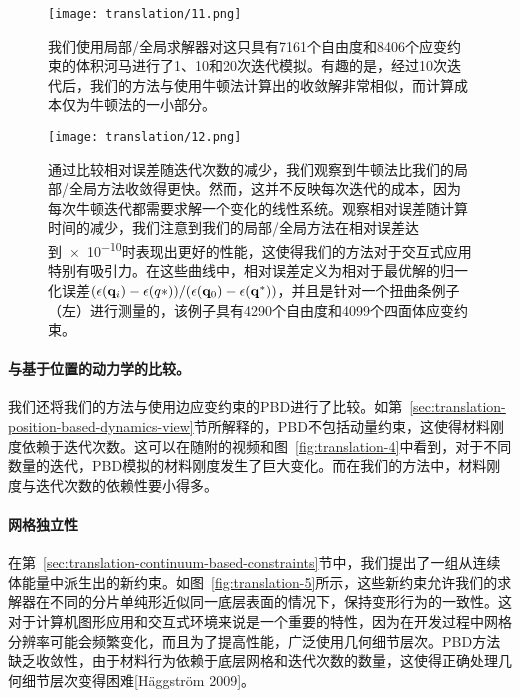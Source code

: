 \begin{translation}
\begin{figure}
  \centering
  \texttt{[image: translation/11.png]}
  \caption{
    我们使用局部/全局求解器对这只具有\num{7161}个自由度和\num{8406}个应变约束的体积河马进行了1、10和20次迭代模拟。有趣的是，经过10次迭代后，我们的方法与使用牛顿法计算出的收敛解非常相似，而计算成本仅为牛顿法的一小部分。
  }
  \label{fig:translation-11}
\end{figure}

\begin{figure}
  \centering
  \texttt{[image: translation/12.png]}
  \caption{
    通过比较相对误差随迭代次数的减少，我们观察到牛顿法比我们的局部/全局方法收敛得更快。然而，这并不反映每次迭代的成本，因为每次牛顿迭代都需要求解一个变化的线性系统。观察相对误差随计算时间的减少，我们注意到我们的局部/全局方法在相对误差达到\num{e-10}时表现出更好的性能，这使得我们的方法对于交互式应用特别有吸引力。在这些曲线中，相对误差定义为相对于最优解的归一化误差$(\epsilon(\vb{q}_i) - \epsilon(q*)) / (\epsilon(\vb{q}_0) - \epsilon(\vb{q}^*))$，并且是针对一个扭曲条例子（左）进行测量的，该例子具有\num{4290}个自由度和\num{4099}个四面体应变约束。
  }
  \label{fig:translation-12}
\end{figure}

\paragraph{与基于位置的动力学的比较。}

我们还将我们的方法与使用边应变约束的PBD进行了比较。如第~\ref{sec:translation-position-based-dynamics-view}节所解释的，PBD不包括动量约束，这使得材料刚度依赖于迭代次数。这可以在随附的视频和图~\ref{fig:translation-4}中看到，对于不同数量的迭代，PBD模拟的材料刚度发生了巨大变化。而在我们的方法中，材料刚度与迭代次数的依赖性要小得多。

\paragraph{网格独立性}

在第~\ref{sec:translation-continuum-based-constraints}节中，我们提出了一组从连续体能量中派生出的新约束。如图~\ref{fig:translation-5}所示，这些新约束允许我们的求解器在不同的分片单纯形近似同一底层表面的情况下，保持变形行为的一致性。这对于计算机图形应用和交互式环境来说是一个重要的特性，因为在开发过程中网格分辨率可能会频繁变化，而且为了提高性能，广泛使用几何细节层次。PBD方法缺乏收敛性，由于材料行为依赖于底层网格和迭代次数的数量，这使得正确处理几何细节层次变得困难[Häggström 2009]。


\end{translation}
